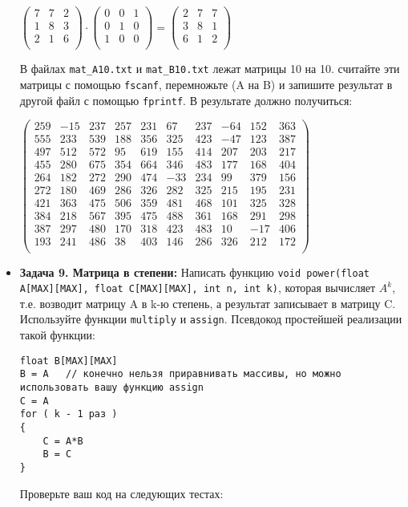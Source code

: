 \documentclass{article}
\begin{document}
\begin{itemize}
\begin{center}

$
\begin{pmatrix}
7 & 7 & 2 \\
1 & 8 & 3 \\
2 & 1 & 6 \\
\end{pmatrix}  \cdot 
\begin{pmatrix}
0 & 0 & 1 \\
0 & 1 & 0 \\
1 & 0 & 0 \\
\end{pmatrix}
=
\begin{pmatrix}
2 & 7 & 7 \\
3 & 8 & 1 \\
6 & 1 & 2 \\
\end{pmatrix}
$
\end{center}
В файлах \texttt{mat\_A10.txt} и \texttt{mat\_B10.txt} лежат матрицы 10 на 10. считайте эти матрицы с помощью \texttt{fscanf}, перемножьте (A на B) и запишите результат в другой файл с помощью \texttt{fprintf}. В результате должно получиться:
\begin{center}
$
\begin{pmatrix}
259 & -15 & 237 & 257 &  231 &  67  & 237  & -64  & 152  & 363 \\
555 & 233 & 539 & 188 &  356 &  325 &  423 &  -47 &  123 &  387 \\
497 & 512 & 572 & 95  & 619  & 155  & 414  & 207  & 203  & 217 \\
455 & 280 & 675 & 354 &  664 &  346 &  483 &  177 &  168 &  404 \\
264 & 182 & 272 & 290 &  474 &  -33 &  234 &  99  & 379  & 156 \\
272 & 180 & 469 & 286 &  326 &  282 &  325 &  215 &  195 &  231 \\
421 & 363 & 475 & 506 &  359 &  481 &  468 &  101 &  325 &  328 \\
384 & 218 & 567 & 395 &  475 &  488 &  361 &  168 &  291 &  298 \\
387 & 297 & 480 & 170 &  318 &  423 &  483 &  10  & -17  & 406 \\
193 & 241 & 486 & 38  & 403  & 146  & 286  & 326  & 212  & 172 \\
\end{pmatrix}
$
\end{center}

\item \textbf{Задача 9. Матрица в степени:} Написать функцию \texttt{void power(float A[MAX][MAX], float C[MAX][MAX], int n, int k)}, которая вычисляет $A^k$, т.е. возводит матрицу A в k-ю степень, а результат записывает в матрицу C. Используйте функции \texttt{multiply} и \texttt{assign}. Псевдокод простейшей реализации такой функции:
\begin{lstlisting}
float B[MAX][MAX]
B = A   // конечно нельзя приравнивать массивы, но можно использовать вашу функцию assign
C = A
for ( k - 1 раз )
{
	C = A*B
	B = C
}
\end{lstlisting}
Проверьте ваш код на следующих тестах:
\begin{center}


\end{center}
\end{itemize}
\end{document}
